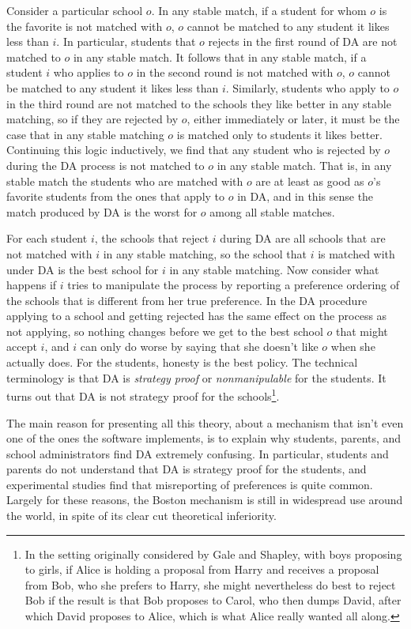 \documentclass[12pt]{article}
\theoremstyle{definition}
\begin{document}
Consider a particular school $o$.  In any stable match, if a student
for whom $o$ is the favorite is not matched with $o$, $o$ cannot be
matched to any student it likes less than $i$.  In particular,
students that $o$ rejects in the first round of DA are not matched to
$o$ in any stable match.  It follows that in any stable match, if a
student $i$ who applies to $o$ in the second round is not matched with
$o$, $o$ cannot be matched to any student it likes less than $i$.
Similarly, students who apply to $o$ in the third round are not
matched to the schools they like better in any stable matching, so if
they are rejected by $o$, either immediately or later, it must be the
case that in any stable matching $o$ is matched only to students it
likes better.  Continuing this logic inductively, we find that any
student who is rejected by $o$ during the DA process is not matched to
$o$ in any stable match.  That is, in any stable match the students
who are matched with $o$ are at least as good as $o$'s favorite
students from the ones that apply to $o$ in DA, and in this sense the
match produced by DA is the worst for $o$ among all stable matches.

For each student $i$, the schools that reject $i$ during DA are all
schools that are not matched with $i$ in any stable matching, so the
school that $i$ is matched with under DA is the best school for $i$ in
any stable matching.  Now consider what happens if $i$ tries to
manipulate the process by reporting a preference ordering of the
schools that is different from her true preference.  In the DA
procedure applying to a school and getting rejected has the same
effect on the process as not applying, so nothing changes before we
get to the best school $o$ that might accept $i$, and $i$ can only do
worse by saying that she doesn't like $o$ when she actually does.  For
the students, honesty is the best policy.  The technical terminology
is that DA is \emph{strategy proof} or \emph{nonmanipulable} for the
students.  It turns out that DA is not strategy proof for the
schools\footnote{In the setting originally considered by Gale and
Shapley, with boys proposing to girls, if Alice is holding a proposal
from Harry and receives a proposal from Bob, who she prefers to Harry,
she might nevertheless do best to reject Bob if the result is that Bob
proposes to Carol, who then dumps David, after which David proposes to
Alice, which is what Alice really wanted all along.}.

The main reason for presenting all this theory, about a mechanism that
isn't even one of the ones the software implements, is to explain why
students, parents, and school administrators find DA extremely
confusing.  In particular, students and parents do not understand that
DA is strategy proof for the students, and experimental studies find
that misreporting of preferences is quite common.  Largely for these
reasons, the Boston mechanism is still in widespread use around the
world, in spite of its clear cut theoretical inferiority.
\end{document}
